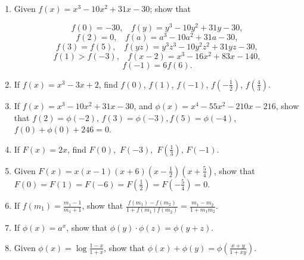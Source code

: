 \begin{enumerate}
\item
Given $f \left( x \right) = x^3 - 10x^2 + 31x - 30$; show that

\[
  f \left( 0 \right) 	= -30,\ \ \ \ f \left( y \right) = y^3 - 10y^2 + 31y - 30,
\]
\[
  f \left( 2 \right) = 0,\ \ \ \  f \left( a \right) 	= a^3 - 10a^2 + 31a - 30,
\]
\[
  f \left( 3 \right) =	f \left( 5 \right),\ \ \ \ 
  f \left( yz \right) = y^3z^3 - 10y^2z^2 + 31yz - 30,
\]
\[
  f \left( 1 \right) > f \left(  -3 \right),\ \ \ \ 
  f \left( x -2 \right) = x^3 - 16x^2 + 83x - 140,
\]
\[
  f \left( -1 \right) = 6f \left( 6 \right). 
\]

\item
If $f \left( x \right) = x^3 - 3x + 2$, find
$f \left( 0 \right)$,
$f \left( 1 \right)$,
$f \left( -1 \right)$,
$f \left ( -\frac{1}{2} \right )$,
$f \left ( \frac{4}{3} \right )$.

\item
If $f \left( x \right) = x^3 - 10x^2 + 31x - 30$, and
$\phi  \left( x \right) = x^4 -55x^2 -210x -216$, show that
$f \left( 2 \right) = \phi \left(  - 2 \right)$,
$f \left( 3 \right) = \phi \left(  - 3 \right),f \left( 5 \right) = \phi \left(  - 4 \right)$,
$f \left( 0 \right) + \phi \left( 0 \right) + 246 = 0$.

\item
If $F \left( x \right) = 2x$, find $F \left( 0 \right)$,\ $F \left( -3 \right)$,\ 
$F \left ( \frac{1}{3} \right )$, $F \left( -1 \right)$.

\item
Given $F(x) 
= x \left( x - 1 \right) \left( x + 6 \right) \left( x - \frac{1}{2} \right) 
\left(x + \frac{5}{4} \right)$, show that
$F \left( 0 \right) = F \left( 1 \right) = F \left( -6 \right) = F \left(\frac{1}{2} \right) 
= F \left( -\frac{5}{4} \right) = 0$.  

\item
If $f \left( m_1 \right) = \frac{m_1 - 1}{m_1 + 1}$, show that
$\frac{f \left( m_1 \right) - f \left( m_2 \right)}{1 + f \left( m_1 \right)f \left( m_2 \right)} = \frac{m_1 - m_2}{1 + m_1 m_2}$.

\item
If $\phi \left( x \right) = a^x$, show that $\phi \left( y \right) \cdot \phi \left( z \right) = \phi \left( y + z \right)$.

\item
Given $\phi \left( x \right) = \log \frac{1 - x}{1 + x}$, show that
$ \phi \left( x \right) + \phi \left( y \right) = \phi \left ( \frac{x + y}{1 + xy} \right )$. 


\end{enumerate}
